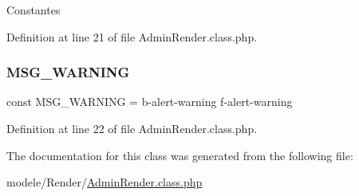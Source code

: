 Constantes 

Definition at line 21 of file Admin\+Render.\+class.\+php.

\mbox{\label{class_admin_render_ae42a019cc5ee2ff36752245ca77b11fe}} 
\subsubsection{\texorpdfstring{M\+S\+G\+\_\+\+W\+A\+R\+N\+I\+NG}{MSG\_WARNING}}
{\footnotesize\ttfamily const M\+S\+G\+\_\+\+W\+A\+R\+N\+I\+NG = \textquotesingle{}b-\/alert-\/warning f-\/alert-\/warning\textquotesingle{}}



Definition at line 22 of file Admin\+Render.\+class.\+php.



The documentation for this class was generated from the following file\+:\begin{DoxyCompactItemize}
\item 
modele/\+Render/\hyperlink{_admin_render_8class_8php}{Admin\+Render.\+class.\+php}\end{DoxyCompactItemize}
